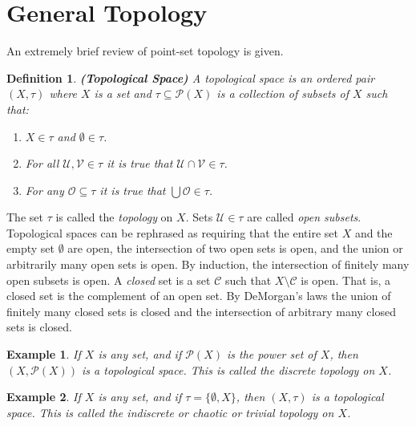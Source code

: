 \documentclass{article}
\theoremstyle{plain}
\theoremstyle{normal}
\newtheorem{definition}{Definition}[section]
\newtheorem{example}{Example}[section]
\begin{document}
    \section{General Topology}
        An extremely brief review of point-set topology is given.
        \begin{definition}{\textbf{(Topological Space)}}
            A topological space is an ordered pair $(X,\tau)$ where $X$ is a
            set and $\tau\subseteq\mathcal{P}(X)$ is a collection of subsets of
            $X$ such that:
            \begin{enumerate}
                \item $X\in\tau$ and $\emptyset\in\tau$.
                \item For all $\mathcal{U},\mathcal{V}\in\tau$ it is true that
                    $\mathcal{U}\cap\mathcal{V}\in\tau$.
                \item For any $\mathcal{O}\subseteq\tau$ it is true that
                    $\bigcup\mathcal{O}\in\tau$.
            \end{enumerate}
        \end{definition}
        The set $\tau$ is called the \textit{topology} on $X$. Sets
        $\mathcal{U}\in\tau$ are called \textit{open subsets}. Topological
        spaces can be rephrased as requiring that the entire set $X$ and the
        empty set $\emptyset$ are open, the intersection of two open sets is
        open, and the union or arbitrarily many open sets is open. By induction,
        the intersection of finitely many open subsets is open. A
        \textit{closed} set is a set $\mathcal{C}$ such that
        $X\setminus\mathcal{C}$ is open. That is, a closed set is the complement
        of an open set. By DeMorgan's laws the union of finitely many closed
        sets is closed and the intersection of arbitrary many closed sets is
        closed.
        \begin{example}
            If $X$ is any set, and if $\mathcal{P}(X)$ is the power set of $X$,
            then $(X,\mathcal{P}(X))$ is a topological space. This is called the
            \textit{discrete} topology on $X$.
        \end{example}
        \begin{example}
            If $X$ is any set, and if $\tau=\{\emptyset,X\}$, then
            $(X,\tau)$ is a topological space. This is called the
            \textit{indiscrete} or \textit{chaotic} or \textit{trivial} topology
            on $X$.
        \end{example}
\end{document}
